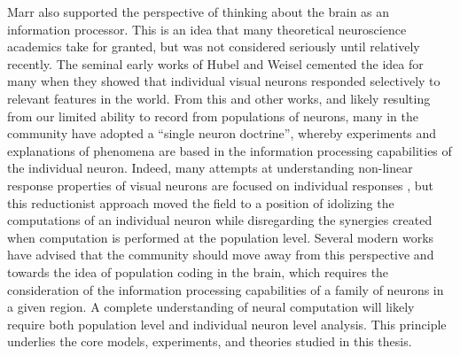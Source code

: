 Marr also supported the perspective of thinking about the brain as an information processor. This is an idea that many theoretical neuroscience academics take for granted, but was not considered seriously until relatively recently. The seminal early works of Hubel and Weisel \citeyearpar{hubel1959receptive} cemented the idea for many when they showed that individual visual neurons responded selectively to relevant features in the world. From this and other works, and likely resulting from our limited ability to record from populations of neurons, many in the community have adopted a ``single neuron doctrine'', whereby experiments and explanations of phenomena are based in the information processing capabilities of the individual neuron. Indeed, many attempts at understanding non-linear response properties of visual neurons are focused on individual responses \parencite{priebe2012mechanisms}, but this reductionist approach moved the field to a position of idolizing the computations of an individual neuron while disregarding the synergies created when computation is performed at the population level. Several modern works have advised that the community should move away from this perspective \parencite{barlow1972single, olshausen1999probabilistic, zetzsche1999atoms, series2003silent} and towards the idea of population coding in the brain, which requires the consideration of the information processing capabilities of a family of neurons in a given region. A complete understanding of neural computation will likely require both population level and individual neuron level analysis. This principle underlies the core models, experiments, and theories studied in this thesis.

